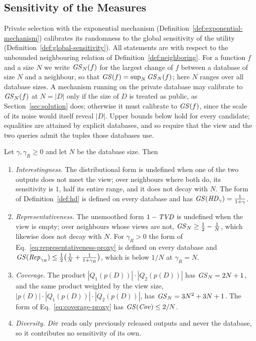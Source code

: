 \subsection{Sensitivity of the Measures}
\label{subsec:ideal-sensitivity}

Private selection with the exponential mechanism (Definition~\ref{def:exponential-mechanism}) calibrates its randomness to the global sensitivity of the utility (Definition~\ref{def:global-sensitivity}).
All statements are with respect to the unbounded neighbouring relation of Definition~\ref{def:neighboring}.
For a function $f$ and a size $N$ we write $\mathit{GS}_N(f)$ for the largest change of $f$ between a database of size $N$ and a neighbour, so that $\mathit{GS}(f)=\sup_N\mathit{GS}_N(f)$; here $N$ ranges over all database sizes.
A mechanism running on the private database may calibrate to $\mathit{GS}_N(f)$ at $N=|D|$ only if the size of $D$ is treated as public, as Section~\ref{sec:solution} does; otherwise it must calibrate to $\mathit{GS}(f)$, since the scale of its noise would itself reveal $|D|$.
Upper bounds below hold for every candidate; equalities are attained by explicit databases, and so require that the view and the two queries admit the tuples those databases use.

\begin{proposition}
\label{prop:sensitivity-itemized}
Let $\gamma,\gamma_R\ge0$ and let $N$ be the database size. Then
\begin{enumerate}[label=(\roman*),leftmargin=*]
\item \emph{Interestingness.} The distributional form is undefined when one of the two outputs does not meet the view; over neighbours where both do, its sensitivity is $1$, half its entire range, and it does not decay with $N$. The form of Definition~\ref{def:hd} is defined on every database and has $\mathit{GS}(\mathit{HD}_\gamma)=\frac{1}{1+\gamma}$.
\item \emph{Representativeness.} The unsmoothed form $1-\mathit{TVD}$ is undefined when the view is empty; over neighbours whose views are not, $\mathit{GS}_N\ge\frac12-\frac1N$, which likewise does not decay with $N$. For $\gamma_R>0$ the form of Eq.~\eqref{eq:representativeness-proxy} is defined on every database and
$\mathit{GS}(\mathit{Rep}_{\gamma_R})\le\frac12\big(\frac1N+\frac1{1+\gamma_R}\big)$, which is below $1/N$ at $\gamma_R=N$.
\item \emph{Coverage.} The product $|Q_1(p(D))|\cdot|Q_2(p(D))|$ has $\mathit{GS}_N=2N+1$, and the same product weighted by the view size, $|p(D)|\cdot|Q_1(p(D))|\cdot|Q_2(p(D))|$, has $\mathit{GS}_N=3N^2+3N+1$. The form of Eq.~\eqref{eq:coverage-proxy} has $\mathit{GS}(\mathit{Cov})\le 2/N$.
\item \emph{Diversity.} $\mathit{Div}$ reads only previously released outputs and never the database, so it contributes no sensitivity of its own.
\end{enumerate}
\end{proposition}

